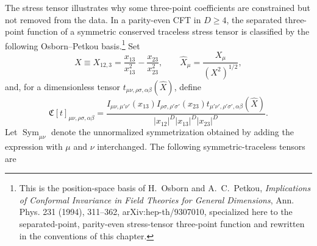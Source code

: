 The stress tensor illustrates why some three-point coefficients are
constrained but not removed from the data.  In a parity-even CFT in
\(D\ge4\), the separated three-point function of a symmetric conserved
traceless stress tensor is classified by the following Osborn--Petkou
basis.\footnote{This is the position-space basis of H.~Osborn and
A.~C.~Petkou, \emph{Implications of Conformal Invariance in Field Theories
for General Dimensions}, Ann. Phys. 231 (1994), 311--362,
arXiv:hep-th/9307010, specialized here to the separated-point, parity-even
stress-tensor three-point function and rewritten in the conventions of this
chapter.}  Set
\[
  X\equiv X_{12,3}
  =
  \frac{x_{13}}{x_{13}^2}
  -
  \frac{x_{23}}{x_{23}^2},
  \qquad
  \widehat X_\mu=\frac{X_\mu}{(X^2)^{1/2}},
\]
and, for a dimensionless tensor
\(t_{\mu\nu,\rho\sigma,\alpha\beta}(\widehat X)\), define
\begin{equation}
  \mathfrak C[t]_{\mu\nu,\rho\sigma,\alpha\beta}
  =
  \frac{
    I_{\mu\nu,\mu'\nu'}(x_{13})
    I_{\rho\sigma,\rho'\sigma'}(x_{23})
    t_{\mu'\nu',\rho'\sigma',\alpha\beta}(\widehat X)}
  {|x_{12}|^D |x_{13}|^D |x_{23}|^D}.
  \label{eq:op-ttt-prefactor}
\end{equation}
Let \(\operatorname{Sym}_{\mu\nu}\) denote the unnormalized symmetrization
obtained by adding the expression with \(\mu\) and \(\nu\) interchanged.  The
following symmetric-traceless tensors are

